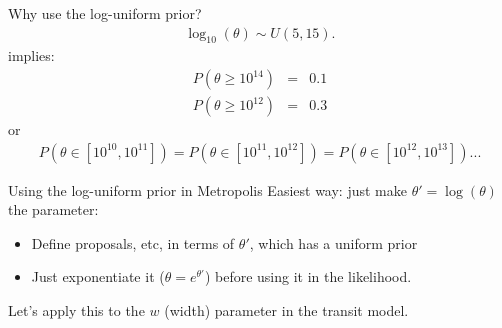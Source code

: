 \begin{frame}[t]{Why use the log-uniform prior?}
\begin{eqnarray*}
\log_{10}(\theta) \sim U(5, 15).
\end{eqnarray*}
implies:
\begin{eqnarray*}
P(\theta \geq 10^{14}) &=& 0.1\\
P(\theta \geq 10^{12}) &=& 0.3
\end{eqnarray*}
or
\begin{eqnarray*}
P(\theta \in [10^{10}, 10^{11}]) = P(\theta \in [10^{11}, 10^{12}])
= P(\theta \in [10^{12}, 10^{13}]) ...
\end{eqnarray*}
\end{frame}

\begin{frame}[t]{Using the log-uniform prior in Metropolis}
Easiest way: just make $\theta' = \log(\theta)$ the parameter:

\begin{itemize}
\item Define proposals, etc, in terms of $\theta'$, which has a uniform prior
\item Just exponentiate it ($\theta = e^{\theta'}$) before using it in the likelihood.
\end{itemize}

Let's apply this to the $w$ (width) parameter in the transit model.
\end{frame}

